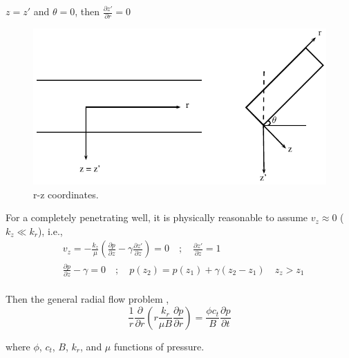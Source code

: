 \documentclass{llncs}
\numberwithin{equation}{section}
\numberwithin{figure}{section}
\numberwithin{table}{section}
\begin{document}
     $z=z'$ and $\theta=0$, then $\frac{\partial z'}{\partial r}=0$ 
    \begin{figure}
        \begin{center}
        \includegraphics[scale=1]{r_z.pdf}
        \end{center}
        \label{r_z}
        \caption{r-z coordinates.}
    \end{figure}    
  
    For a completely penetrating well, it is physically reasonable to assume $v_{z}\approx0$ ($k_{z}\ll k_{r}$), i.e.,
    \begin{equation}
    \begin{split}
    & {{v}_{z}}=-\frac{{{k}_{z}}}{\mu }\left( \frac{\partial p}{\partial z}-\gamma \frac{\partial z'}{\partial z} \right)=0\quad ;\quad \frac{\partial z'}{\partial z}=1 \\
    & \frac{\partial p}{\partial z}-\gamma =0\quad ;\quad p\left( {{z}_{2}} \right)=p\left( {{z}_{1}} \right)+\gamma \left( {{z}_{2}}-{{z}_{1}} \right)\quad {{z}_{z}}>{{z}_{1}} \\
    \end{split}
    \end{equation}    
 
        Then the general radial flow problem ,
    \begin{equation}
        \frac{1}{r}\frac{\partial }{\partial r}\left( r\frac{{{k}_{r}}}{\mu B}\frac{\partial p}{\partial r} \right)=\frac{\phi {{c}_{t}}}{B}\frac{\partial p}{\partial t}
        \label{Radial_flow_general}
    \end{equation} 
    
    where $\phi$, $c_{t}$, $B$, $k_{r}$, and $\mu$  functions of pressure.
    
\end{document}
